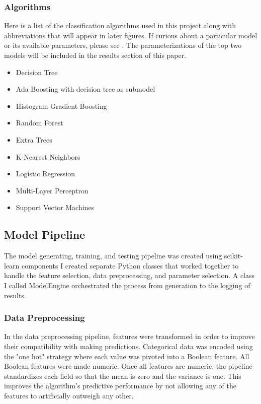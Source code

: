 \documentclass{article}
\begin{document}
            \subsubsection{Algorithms}
                Here is a list of the classification algorithms used in this project along with abbreviations that will appear in later figures. 
                If curious about a particular model or its available parameters, please see \cite{sklearn}.
                The parameterizations of the top two models will be included in the results section of this paper.
                \begin{itemize}
                    \item Decision Tree
                    \item Ada Boosting with decision tree as submodel
                    \item Histogram Gradient Boosting
                    \item Random Forest
                    \item Extra Trees
                    \item K-Nearest Neighbors
                    \item Logistic Regression
                    \item Multi-Layer Perceptron
                    \item Support Vector Machines
                \end{itemize}

        \subsection{Model Pipeline}
            The model generating, training, and testing pipeline was created using scikit-learn components \cite{sklearn} 
            I created separate Python classes that worked together to handle the feature selection, data preprocessing, and parameter selection.
            A class I called ModelEngine orchestrated the process from generation to the logging of results.

            \subsubsection{Data Preprocessing}
                In the data preprocessing pipeline, features were transformed in order to improve their compatibility with making predictions.
                Categorical data was encoded using the "one hot" strategy where each value was pivoted into a Boolean feature.    
                All Boolean features were made numeric.
                Once all features are numeric, the pipeline standardizes each field so that the mean is zero and the variance is one.
                This improves the algorithm's predictive performance by not allowing any of the features to artificially outweigh any other.
                
\end{document}
